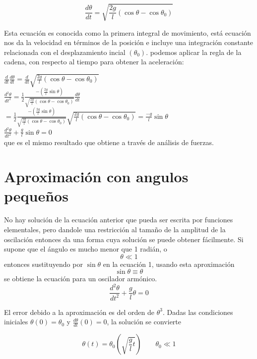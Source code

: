 \documentclass[12pt]{article}
\begin{document}
\begin{equation}
\nonumber \frac{d\theta}{dt}=\sqrt{\frac{2g}{l}(\cos\theta-\cos\theta_0)}
\end{equation}

Esta ecuación es conocida como la primera integral de movimiento, está ecuación nos da la velocidad en términos de la posición e incluye una integración constante relacionada con el desplazamiento incial $(\theta_0)$. podemos aplicar la regla de la cadena, con respecto al tiempo para obtener la aceleración:

$\frac{d}{dt}\frac{d\theta}{dt}=\frac{d}{dt}\sqrt{\frac{2g}{l}(\cos\theta-\cos\theta_0)}$\\
	
$\frac{d^2\theta}{dt^2}=\frac{1}{2} \frac{-(\frac{2g}{l}\sin\theta)}{\sqrt{\frac{2g}{l}(\cos\theta-\cos\theta_0)}}\frac{d\theta}{dt}$	\\	
	
$=\frac{1}{2}\frac{-(\frac{2g}{l}\sin\theta)}{\sqrt{\frac{2g}{l}(\cos\theta-\cos\theta_0)}}\sqrt{\frac{2g}{l}(\cos\theta-\cos\theta_0)}=\frac{-g}{l}\sin\theta$ \\
			
$\frac{d^2\theta}{dt^2}+\frac{g}{l}\sin\theta = 0$ \\

que es el mismo resultado que obtiene a través de análisis de fuerzas.

	
\section{Aproximación con angulos pequeños}
No hay solución de la ecuación anterior que pueda ser escrita por funciones elementales, pero dandole una restricción al tamaño de la amplitud de la oscilación entonces da una forma cuya solución se puede obtener fácilmente. Si supone que el ángulo es mucho menor que 1 radián, o $$\theta  \ll 1$$ entonces sustituyendo por $\sin \theta$ en la ecuación 1, usando esta aproximación $$\sin \theta \equiv\theta$$ se obtiene la ecuación para un oscilador armónico.
 \begin{equation}
 \nonumber \frac{d^2\theta}{dt^2}+\frac{g}{l}\theta=0
 \end{equation}

El error debido a la aproximación es del orden de $\theta^3$.
Dadas las condiciones iniciales $\theta(0)=\theta_0$ y $\frac{d\theta}{dt}(0)=0$, la solución se convierte

\begin{equation}
\nonumber \theta(t)= \theta_0 (\sqrt{\frac{g}{l}t})  \qquad \theta_0 \ll 1
\end{equation}
\end{document}
